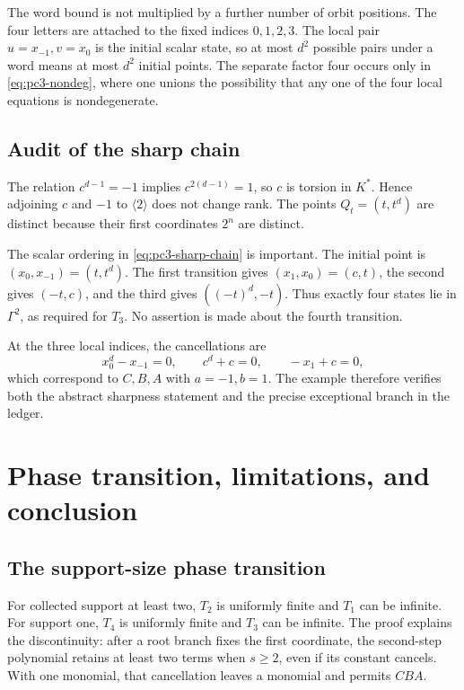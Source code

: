 \documentclass[11pt]{article}
\theoremstyle{definition}
\begin{document}
The word bound is not multiplied by a further number of orbit positions. The four letters are attached to the fixed indices \(0,1,2,3\). The local pair \(u=x_{-1},v=x_0\) is the initial scalar state, so at most \(d^2\) possible pairs under a word means at most \(d^2\) initial points. The separate factor four occurs only in \eqref{eq:pc3-nondeg}, where one unions the possibility that any one of the four local equations is nondegenerate.

\subsection{Audit of the sharp chain}

The relation \(c^{d-1}=-1\) implies \(c^{2(d-1)}=1\), so \(c\) is torsion in \(K^*\). Hence adjoining \(c\) and \(-1\) to \(\langle2\rangle\) does not change rank. The points \(Q_t=(t,t^d)\) are distinct because their first coordinates \(2^n\) are distinct.

The scalar ordering in \eqref{eq:pc3-sharp-chain} is important. The initial point is \((x_0,x_{-1})=(t,t^d)\). The first transition gives \((x_1,x_0)=(c,t)\), the second gives \((-t,c)\), and the third gives \(((-t)^d,-t)\). Thus exactly four states lie in \(\Gamma^2\), as required for \(T_3\). No assertion is made about the fourth transition.

At the three local indices, the cancellations are
\[
 x_0^d-x_{-1}=0,\qquad c^d+c=0,\qquad -x_1+c=0,
\]
which correspond to \(C,B,A\) with \(a=-1,b=1\). The example therefore verifies both the abstract sharpness statement and the precise exceptional branch in the ledger.

\section{Phase transition, limitations, and conclusion}
\label{sec:conclusion}

\subsection{The support-size phase transition}

For collected support at least two, \(T_2\) is uniformly finite and \(T_1\) can be infinite. For support one, \(T_4\) is uniformly finite and \(T_3\) can be infinite. The proof explains the discontinuity: after a root branch fixes the first coordinate, the second-step polynomial retains at least two terms when \(s\geq2\), even if its constant cancels. With one monomial, that cancellation leaves a monomial and permits \(CBA\).
\end{document}

